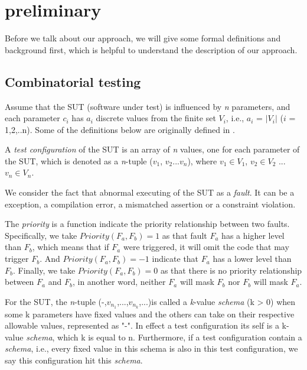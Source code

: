 \documentclass{sig-alternate}
\begin{document}
\section{preliminary}
Before we talk about our approach, we will give some formal definitions and background first, which is helpful to understand the description of our approach.

\subsection{Combinatorial testing}
Assume that the SUT (software under test) is influenced by \emph{n} parameters, and each parameter $c_{i}$ has $a_{i}$ discrete values from the finite set $V_{i}$, i.e., $a_{i}$ = $|V_{i}|$ ($i$ = 1,2,..n). Some of the definitions below are originally defined in .

\begin{definition}
A \emph{test configuration} of the SUT is an array of \emph{n} values, one for each parameter of the SUT, which is denoted as a \emph{n}-tuple ($v_{1}$, $v_{2}$...$v_{n}$), where $v_{1}\in V_{1}$, $v_{2} \in V_{2}$ ... $v_{n} \in V_{n}$.
\end{definition}

\begin{definition}
We consider the fact that abnormal executing of the SUT as a \emph{fault}. It can be a exception, a compilation error, a mismatched assertion or a constraint violation.
\end{definition}

\begin{definition}
The \emph{priority} is a function indicate the  priority relationship between two faults. Specifically, we take $Priority(F_{a},F_{b}) = 1$ as that fault $F_{a}$ has a higher level than $F_{b}$, which means that if $F_{a}$ were triggered, it will omit the code that may trigger $F_{b}$. And $Priority(F_{a},F_{b}) = -1$ indicate that $F_{a}$ has a lower level than $F_{b}$. Finally, we take $Priority(F_{a},F_{b}) = 0$ as that there is no priority relationship between   $F_{a} $ and  $F_{b}$, in another word, neither  $F_{a}$ will mask  $F_{b}$ nor  $F_{b}$ will mask  $F_{a}$.
\end{definition}

\begin{definition}
For the SUT, the \emph{n}-tuple (-,$v_{n_{1}}$,...,$v_{n_{k}}$,...)is called a \emph{k}-value \emph{schema} (k > 0) when some k parameters have fixed values and the others can take on their respective allowable values, represented as "-". In effect a test configuration its self is a k-value \emph{schema}, which k is equal to n. Furthermore, if a test configuration contain a \emph{schema}, i.e., every fixed value in this schema is also in this test configuration, we say this configuration hit this \emph{schema}.
\end{definition}
\end{document}
